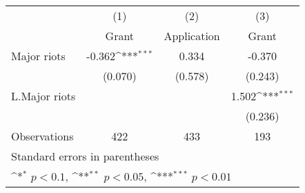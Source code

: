 {
\def\sym#1{\ifmmode^{#1}\else\(^{#1}\)\fi}
\begin{tabular}{l*{3}{c}}
\hline\hline
                    &\multicolumn{1}{c}{(1)}&\multicolumn{1}{c}{(2)}&\multicolumn{1}{c}{(3)}\\
                    &\multicolumn{1}{c}{Grant}&\multicolumn{1}{c}{Application}&\multicolumn{1}{c}{Grant}\\
\hline
Major riots         &      -0.362\sym{***}&       0.334         &      -0.370         \\
                    &     (0.070)         &     (0.578)         &     (0.243)         \\
[1em]
L.Major riots       &                     &                     &       1.502\sym{***}\\
                    &                     &                     &     (0.236)         \\
\hline
Observations        &         422         &         433         &         193         \\
\hline\hline
\multicolumn{4}{l}{\footnotesize Standard errors in parentheses}\\
\multicolumn{4}{l}{\footnotesize \sym{*} \(p<0.1\), \sym{**} \(p<0.05\), \sym{***} \(p<0.01\)}\\
\end{tabular}
}
